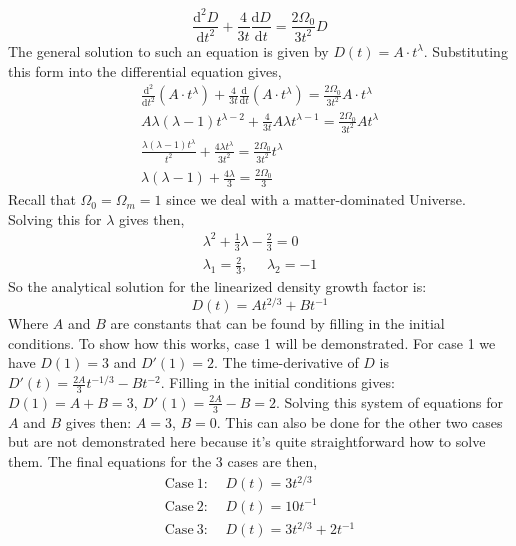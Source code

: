 \begin{equation}
\frac{\mathrm{d}^2D}{\mathrm{d}t^2} + \frac{4}{3t} \frac{\mathrm{d}{D}}{\mathrm{d}t} = \frac{2 \Omega_0}{3 t^2} D
\end{equation}
The general solution to such an equation is given by $D(t) = A\cdot t^{\lambda}$. Substituting this form into the differential equation gives,
\begin{gather*}
\frac{\mathrm{d}^2}{\mathrm{d}t^2}\left(A\cdot t^{\lambda}\right) + \frac{4}{3t} \frac{\mathrm{d}}{\mathrm{d}t}\left(A\cdot t^{\lambda}\right) = \frac{2\Omega_0}{3t^2} A\cdot t^{\lambda}\\
A\lambda(\lambda - 1) t^{\lambda - 2} + \frac{4}{3t}A\lambda t^{\lambda-1} = \frac{2\Omega_0}{3t^2} At^{\lambda}\\
\frac{\lambda(\lambda-1)t^{\lambda}}{t^2} + \frac{4\lambda t^{\lambda}}{3t^2} = \frac{2\Omega_0}{3t^2} t^{\lambda}\\
\lambda(\lambda-1) + \frac{4\lambda}{3} = \frac{2\Omega_0}{3}
\end{gather*}
Recall that $\Omega_0 = \Omega_m = 1$ since we deal with a matter-dominated Universe. Solving this for $\lambda$ gives then,
\begin{gather*}
\lambda^2 + \frac{1}{3}\lambda - \frac{2}{3} = 0\\
\lambda_1  = \frac{2}{3}, \mathrm{\ \ \ \ \ \ } \lambda_2 = -1
\end{gather*}
So the analytical solution for the linearized density growth factor is:
\begin{equation}
D(t) = At^{2/3} + Bt^{-1}
\end{equation}
Where $A$ and $B$ are constants that can be found by filling in the initial conditions. To show how this works, case 1 will be demonstrated. For case 1 we have $D(1) = 3$ and $D'(1) = 2$. The time-derivative of $D$ is $D'(t) = \frac{2A}{3}t^{-1/3} - Bt^{-2}$. Filling in the initial conditions gives: $D(1) = A + B = 3$, $D'(1) = \frac{2A}{3} - B = 2$. Solving this system of equations for $A$ and $B$ gives then: $A = 3$, $B=0$. This can also be done for the other two cases but are not demonstrated here because it's quite straightforward how to solve them. The final equations for the 3 cases are then,
\begin{gather}
\mathrm{Case \ 1: \ \ \ \ \ } D(t) = 3t^{2/3}\\
\mathrm{Case \ 2: \ \ \ \ \ } D(t) = 10t^{-1}\\
\mathrm{Case \ 3: \ \ \ \ \ } D(t) = 3t^{2/3} + 2t^{-1}
\end{gather}
